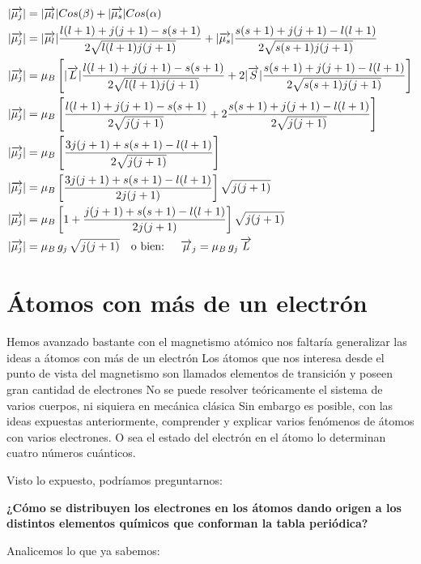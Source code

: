 \begin{equation*}
	\begin{aligned}[c]
	&\vert \overrightarrow{\mu_{j}} \vert=\vert \overrightarrow{\mu_{l}} \vert Cos(\beta)+\vert \overrightarrow{\mu_{s}} \vert Cos(\alpha) \\
	&\vert \overrightarrow{\mu_{j}} \vert=\vert \overrightarrow{\mu_{l}} \vert\dfrac{l(l + 1)+j(j + 1)-s(s + 1)}{2\sqrt{l(l + 1)j(j + 1)}}+\vert \overrightarrow{\mu_{s}} \vert\dfrac{s(s + 1)+j(j + 1)-l(l + 1)}{2\sqrt{s(s + 1)j(j + 1)}} \\
	&\vert \overrightarrow{\mu_{j}} \vert=\mu_{B}\left[\vert \overrightarrow{L} \vert \dfrac{l(l + 1)+j(j + 1)-s(s + 1)}{2\sqrt{l(l + 1)j(j + 1)}}+2\vert \overrightarrow{S} \vert\dfrac{s(s + 1)+j(j + 1)-l(l + 1)}{2\sqrt{s(s + 1)j(j + 1)}}\right] \\ 
	&\vert \overrightarrow{\mu_{j}} \vert=\mu_{B}\left[ \dfrac{l(l + 1)+j(j + 1)-s(s + 1)}{2\sqrt{j(j + 1)}}+2\dfrac{s(s + 1)+j(j + 1)-l(l + 1)}{2\sqrt{j(j + 1)}}\right] \\
	&\vert \overrightarrow{\mu_{j}} \vert=\mu_{B}\left[ \dfrac{3j(j + 1)+s(s + 1)-l(l + 1)}{2\sqrt{j(j + 1)}} \right] \\
	&\vert \overrightarrow{\mu_{j}} \vert=\mu_{B}\left[ \dfrac{3j(j + 1)+s(s + 1)-l(l + 1)}{2j(j + 1)} \right]\sqrt{ j(j + 1)} \\	
	&\vert \overrightarrow{\mu_{j}} \vert=\mu_{B}\left[1+ \dfrac{j(j + 1)+s(s + 1)-l(l + 1)}{2j(j + 1)} \right]\sqrt{j(j + 1)} \\	
	&\vert \overrightarrow{\mu_{j}} \vert=\mu_{B}\,g_{j}\,\sqrt{j(j + 1)}\quad \text{o bien: } \quad \overrightarrow{\mu}_{j}=\mu_{B}\,g_{j}\,\overrightarrow{L} 	
	\end{aligned}
\end{equation*} 



\section{Átomos con más de un electrón}
Hemos avanzado bastante con el magnetismo atómico nos faltaría generalizar las ideas a átomos con más de un electrón Los átomos que nos interesa desde el punto de vista del magnetismo son llamados elementos de transición y poseen gran cantidad de electrones No se puede resolver teóricamente el sistema de varios cuerpos, ni siquiera en mecánica clásica Sin embargo es posible, con las ideas expuestas anteriormente, comprender y explicar varios fenómenos de átomos con varios electrones. O sea el estado del electrón en el átomo lo determinan cuatro números cuánticos.


Visto lo expuesto, podríamos preguntarnos:

\textbf{¿Cómo se distribuyen los electrones en los átomos dando origen a los distintos elementos químicos que conforman la tabla periódica?}

Analicemos lo que ya sabemos:

